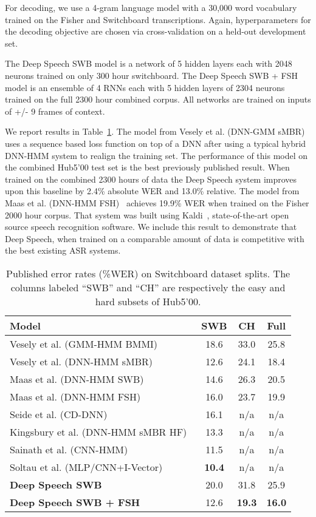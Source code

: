 For decoding, we use a 4-gram language model with a 30,000 word vocabulary
trained on the Fisher and Switchboard transcriptions. Again, hyperparameters
for the decoding objective are chosen via cross-validation on a held-out
development set.

The Deep Speech SWB model is a network of 5 hidden layers each with 2048
neurons trained on only 300 hour switchboard. The Deep Speech SWB + FSH model
is an ensemble of 4 RNNs each with 5 hidden layers of 2304 neurons trained on
the full 2300 hour combined corpus. All networks are trained on inputs of +/- 9
frames of context.

We report results in Table~\ref{table:deepspeech:hub5}. The model from Vesely
et al.  (DNN-GMM sMBR)~\cite{vesely2013} uses a sequence based loss function on
top of a DNN after using a typical hybrid DNN-HMM system to realign the
training set.  The performance of this model on the combined Hub5'00 test set
is the best previously published result. When trained on the combined 2300
hours of data the Deep Speech system improves upon this baseline by 2.4\%
absolute WER and 13.0\% relative. The model from Maas et al. (DNN-HMM
FSH)~\cite{maas2014} achieves 19.9\% WER when trained on the Fisher 2000 hour
corpus. That system was built using Kaldi~\cite{povey2011}, state-of-the-art
open source speech recognition software. We include this result to demonstrate
that Deep Speech, when trained on a comparable amount of data is competitive
with the best existing ASR systems.

\begin{table}[ht!]
\centering
\begin{tabular}{l  c  c  c }
\toprule
Model & SWB & CH & Full \\
\midrule
Vesely et al. (GMM-HMM BMMI)~\cite{vesely2013}   & 18.6 & 33.0 & 25.8 \\
Vesely et al. (DNN-HMM sMBR)~\cite{vesely2013}    & 12.6 & 24.1  & 18.4 \\
Maas et al. (DNN-HMM SWB)~\cite{maas2014}  & 14.6 & 26.3  & 20.5 \\
Maas et al. (DNN-HMM FSH)~\cite{maas2014}  & 16.0 & 23.7  & 19.9 \\
Seide et al. (CD-DNN)~\cite{seide2011}     & 16.1 & n/a & n/a \\
Kingsbury et al. (DNN-HMM sMBR HF)~\cite{kingsbury2012}  & 13.3 & n/a & n/a \\
Sainath et al. (CNN-HMM)~\cite{sainath2013deep} & 11.5 & n/a & n/a \\
Soltau et al. (MLP/CNN+I-Vector)~\cite{soltau2014} & {\bf 10.4 } & n/a & n/a \\
{\bf Deep Speech SWB} & 20.0 & 31.8 & 25.9 \\
{\bf Deep Speech SWB + FSH} & 12.6 & {\bf 19.3} & {\bf 16.0} \\
\bottomrule
\end{tabular}
\caption{Published error rates (\%WER) on Switchboard dataset splits. The
         columns labeled ``SWB'' and ``CH'' are respectively the easy and hard
         subsets of Hub5'00.}
\label{table:deepspeech:hub5}
\end{table}


